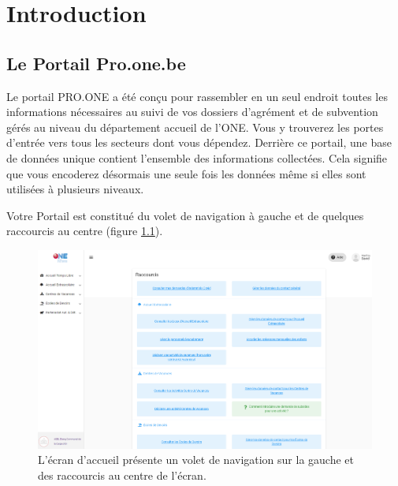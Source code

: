 \setcounter{chapter}{-1}
\renewcommand{\thechapter}{\Roman{chapter}}

\chapter{Introduction}



\section{Le Portail Pro.one.be}
Le portail PRO.ONE a été conçu pour rassembler en un seul endroit toutes les informations nécessaires au suivi de vos dossiers d’agrément et de subvention gérés au niveau du département accueil de l’ONE. Vous y trouverez les portes d’entrée vers tous les secteurs dont vous dépendez. Derrière ce portail, une base de données unique contient l’ensemble des informations collectées. Cela signifie que vous encoderez désormais une seule fois les données même si elles sont utilisées à plusieurs niveaux.

Votre Portail est constitué du volet de navigation à gauche et de quelques raccourcis au centre (figure \ref{fig:home_page}).

\begin{figure}[h]
    \centering
    \includegraphics[width=16cm]{Images/intro/home_page.png}
    \caption{L'écran d'accueil présente un volet de navigation sur la gauche et des raccourcis au centre de l'écran.}
    \label{fig:home_page}
\end{figure}


